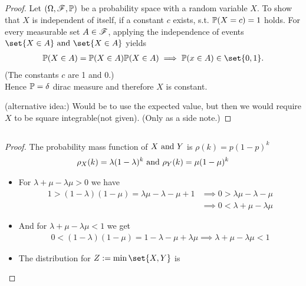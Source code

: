 \subsection{}
\begin{proof} %
	\item Let $(\Omega, \mathscr{F}, \mathbb{P})$ be a probability space with a random variable $X$. To show that $X$ is independent of itself, if a constant $c$ exists, s.t. $\mathbb{P}(X =c) = 1$ holds.
	For every measurable set $A \in \mathscr{F}$, applying the independence of events $\set{X \in A} \and \set{X \in A}$ yields
	\begin{align*}
	\meas(X \in A) = \meas(X \in A)\meas(X \in A) \implies \meas(x \in A) \in \set{0,1}.
	\end{align*}
	(The constants $c$ are 1 and 0.)\\
	Hence $\mathbb{P} = \delta$ dirac measure and therefore $X$ is constant.
	\item (alternative idea:) Would be to use the expected value, but then we would require $X$ to be square integrable(not given). (Only as a side note.)
\end{proof}
\subsection{}
\begin{proof}
	The probability mass function of $X \text{ and } Y$ is $\rho(k) = p(1-p)^k$
	\begin{align*}
		\rho_X(k) = \lambda(1-\lambda)^k \text{ and } \rho_Y (k) = \mu(1-\mu)^k
	\end{align*}
	\begin{itemize}
		\item For $\lambda + \mu -\lambda \mu > 0$ we have
		\begin{align*}
			1 > (1-\lambda)(1-\mu) = \lambda \mu -\lambda -\mu + 1 &\implies 0 > \lambda \mu - \lambda - \mu\\
			&\implies 0 < \lambda + \mu - \lambda \mu
		\end{align*}
		\item And for $\lambda + \mu - \lambda \mu < 1$ we get
		\begin{align*}
			0 < (1-\lambda)(1-\mu) = 1 - \lambda - \mu + \lambda\mu \implies \lambda + \mu - \lambda \mu < 1
		\end{align*}
		\item The distribution for $Z := \min\set{X,Y}$ is
	\end{itemize}
\end{proof}


